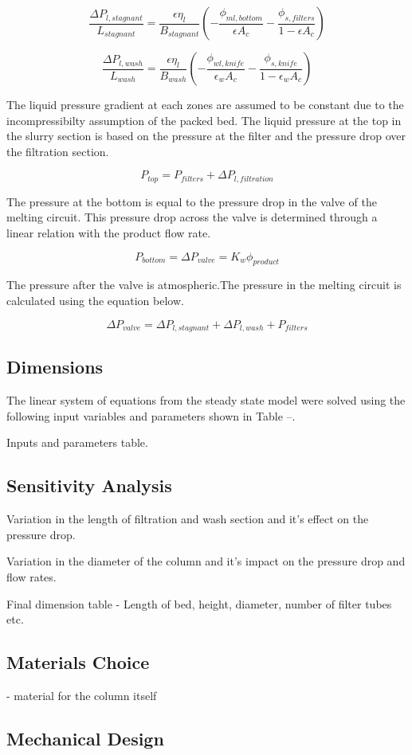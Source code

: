 \begin{equation}
\frac{\Delta P_{l,stagnant}}{L_{stagnant}}=\frac{\epsilon \eta_{l}}{B_{stagnant}}\left(-\frac{\phi_{ml,bottom}}{\epsilon A_c} - \frac{\phi_{s,filters}}{1-\epsilon A_c}\right)
\end{equation}

\begin{equation}
\frac{\Delta P_{l,wash}}{L_{wash}}=\frac{\epsilon \eta_{l}}{B_{wash}}\left(-\frac{\phi_{wl,knife}}{\epsilon_w A_c} - \frac{\phi_{s,knife}}{1-\epsilon_w A_c}\right)
\end{equation}

The liquid pressure gradient at each zones are assumed to be constant due to the incompressibilty assumption of the packed bed. The liquid pressure at the top in the slurry section is based on the pressure at the filter and the pressure drop over the filtration section. 

\begin{equation}
P_{top} = P_{filters} + \Delta P_{l,filtration}
\end{equation}


The pressure at the bottom is equal to the pressure drop in the valve of the melting circuit. This pressure drop across the valve is determined through a linear relation with the product flow rate. 

\begin{equation}
P_{bottom}=\Delta P_{valve} = K_w\phi_{product}
\end{equation}

The pressure after the valve is atmospheric.The pressure in the melting circuit is calculated using the equation below. 

\begin{equation}
\Delta P_{valve} = \Delta P_{l,stagnant} + \Delta P_{l,wash} + P_{filters}
\end{equation}

\subsection{Dimensions} 
The linear system of equations from the steady state model were solved using the following input variables and parameters shown in Table --. 

Inputs and parameters table. 

\subsection{Sensitivity Analysis}
Variation in the length of filtration and wash section and it's effect on the pressure drop. 

Variation in the diameter of the column and it's impact on the pressure drop and flow rates. 

Final dimension table - Length of bed, height, diameter, number of filter tubes etc. 



\subsection{Materials Choice}
- material for the column itself 

\subsection{Mechanical Design}

